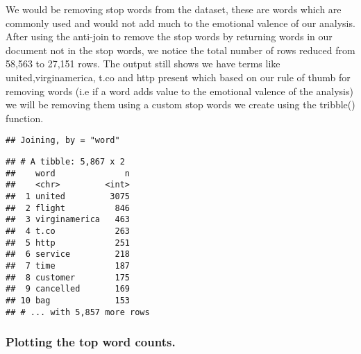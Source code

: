 \documentclass[
]{article}
\newenvironment{Shaded}{\begin{snugshade}}{\end{snugshade}}
\newcommand{\CommentTok}[1]{\textcolor[rgb]{0.56,0.35,0.01}{\textit{#1}}}
\newcommand{\KeywordTok}[1]{\textcolor[rgb]{0.13,0.29,0.53}{\textbf{#1}}}
\newcommand{\NormalTok}[1]{#1}
\newcommand{\OperatorTok}[1]{\textcolor[rgb]{0.81,0.36,0.00}{\textbf{#1}}}
\newcommand{\StringTok}[1]{\textcolor[rgb]{0.31,0.60,0.02}{#1}}
\begin{document}
We would be removing stop words from the dataset, these are words which
are commonly used and would not add much to the emotional valence of our
analysis. After using the anti-join to remove the stop words by
returning words in our document not in the stop words, we notice the
total number of rows reduced from 58,563 to 27,151 rows. The output
still shows we have terms like united,virginamerica, t.co and http
present which based on our rule of thumb for removing words (i.e if a
word adds value to the emotional valence of the analysis) we will be
removing them using a custom stop words we create using the tribble()
function.

\begin{Shaded}
\end{Shaded}

\begin{verbatim}
## Joining, by = "word"
\end{verbatim}

\begin{Shaded}
\end{Shaded}

\begin{verbatim}
## # A tibble: 5,867 x 2
##    word              n
##    <chr>         <int>
##  1 united         3075
##  2 flight          846
##  3 virginamerica   463
##  4 t.co            263
##  5 http            251
##  6 service         218
##  7 time            187
##  8 customer        175
##  9 cancelled       169
## 10 bag             153
## # ... with 5,857 more rows
\end{verbatim}

\hypertarget{plotting-the-top-word-counts.}{%
\subsubsection{Plotting the top word
counts.}\label{plotting-the-top-word-counts.}}
\end{document}
